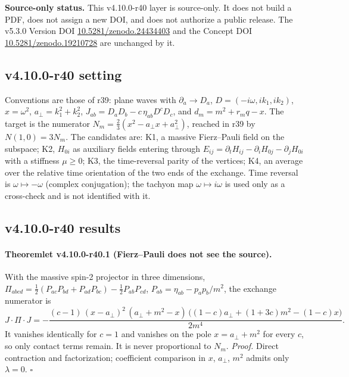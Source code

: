 \noindent\textbf{Source-only status.}
This v4.10.0-r40 layer is source-only.  It does not build a PDF, does not assign a new DOI,
and does not authorize a public release.  The v5.3.0 Version DOI
\href{https://doi.org/10.5281/zenodo.24434403}{10.5281/zenodo.24434403} and the Concept DOI
\href{https://doi.org/10.5281/zenodo.19210728}{10.5281/zenodo.19210728} are unchanged by it.

\subsection*{v4.10.0-r40 setting}
\label{subsec:v4100-r40-setting}

Conventions are those of r39: plane waves with \(\partial_a\to D_a\), \(D=(-i\omega,ik_1,ik_2)\), \(x=\omega^2\), \(a_\perp=k_1^2+k_2^2\),
\(J_{ab}=D_aD_b-c\,\eta_{ab}D^cD_c\), and \(d_m=m^2+r_mq-x\).  The target is the numerator \(N_m=\tfrac23(x^2-a_\perp x+a_\perp^2)\), reached in r39 by
\(N(1,0)=3N_m\).  The candidates are: K1, a massive Fierz--Pauli field on the subspace; K2, \(H_{0i}\) as auxiliary fields entering through
\(E_{ij}=\partial_tH_{ij}-\partial_iH_{0j}-\partial_jH_{0i}\) with a stiffness \(\mu\ge0\); K3, the time-reversal parity of the vertices; K4, an average over
the relative time orientation of the two ends of the exchange.  Time reversal is \(\omega\mapsto-\omega\) (complex conjugation); the tachyon map
\(\omega\mapsto i\omega\) is used only as a cross-check and is not identified with it.

\subsection*{v4.10.0-r40 results}
\label{subsec:v4100-r40-results}

\paragraph{Theoremlet v4.10.0-r40.1 (Fierz--Pauli does not see the source).}
With the massive spin-2 projector in three dimensions, \(\Pi_{abcd}=\tfrac12(P_{ac}P_{bd}+P_{ad}P_{bc})-\tfrac12P_{ab}P_{cd}\),
\(P_{ab}=\eta_{ab}-p_ap_b/m^2\), the exchange numerator is
\[
 J\cdot\Pi\cdot J=-\frac{(c-1)\,(x-a_\perp)^2\,(a_\perp+m^2-x)\,\bigl((1-c)a_\perp+(1+3c)m^2-(1-c)x\bigr)}{2m^4}.
\]
It vanishes identically for \(c=1\) and vanishes on the pole \(x=a_\perp+m^2\) for every \(c\), so only contact terms remain.  It is never
proportional to \(N_m\).
\emph{Proof.} Direct contraction and factorization; coefficient comparison in \(x\), \(a_\perp\), \(m^2\) admits only \(\lambda=0\).  \(\square\)

